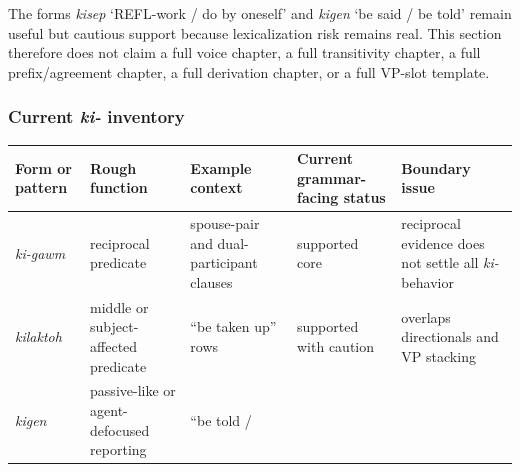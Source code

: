 \documentclass[
  11pt,
  a4paper,
]{article}
\newcounter{none} %
\newcommand{\tdim}[1]{\textit{#1}}
\newcommand{\glossquote}[1]{`#1'}
\begin{document}
The forms \tdim{kisep} \glossquote{REFL-work / do by oneself} and
\tdim{kigen} \glossquote{be said / be told} remain useful but cautious
support because lexicalization risk remains real. This section therefore
does not claim a full voice chapter, a full transitivity chapter, a full
prefix/agreement chapter, a full derivation chapter, or a full VP-slot
template.

\subsubsection{\texorpdfstring{Current \tdim{ki-}
inventory}{Current  inventory}}\label{current-inventory}

{\def\LTcaptype{none} %
\begin{longtable}[]{@{}
  >{\raggedright\arraybackslash}p{}
  >{\raggedright\arraybackslash}p{}
  >{\raggedright\arraybackslash}p{}
  >{\raggedright\arraybackslash}p{}
  >{\raggedright\arraybackslash}p{}@{}}
\toprule\noalign{}
\begin{minipage}[b]{\linewidth}\raggedright
Form or pattern
\end{minipage} & \begin{minipage}[b]{\linewidth}\raggedright
Rough function
\end{minipage} & \begin{minipage}[b]{\linewidth}\raggedright
Example context
\end{minipage} & \begin{minipage}[b]{\linewidth}\raggedright
Current grammar-facing status
\end{minipage} & \begin{minipage}[b]{\linewidth}\raggedright
Boundary issue
\end{minipage} \\
\midrule\noalign{}
\endhead
\bottomrule\noalign{}
\endlastfoot
\tdim{ki-gawm} & reciprocal predicate & spouse-pair and dual-participant
clauses & supported core & reciprocal evidence does not settle all
\tdim{ki-} behavior \\
\tdim{kilaktoh} & middle or subject-affected predicate & ``be taken up''
rows & supported with caution & overlaps directionals and VP stacking \\
\tdim{kigen} & passive-like or agent-defocused reporting & ``be told /

\end{longtable}}
\end{document}
